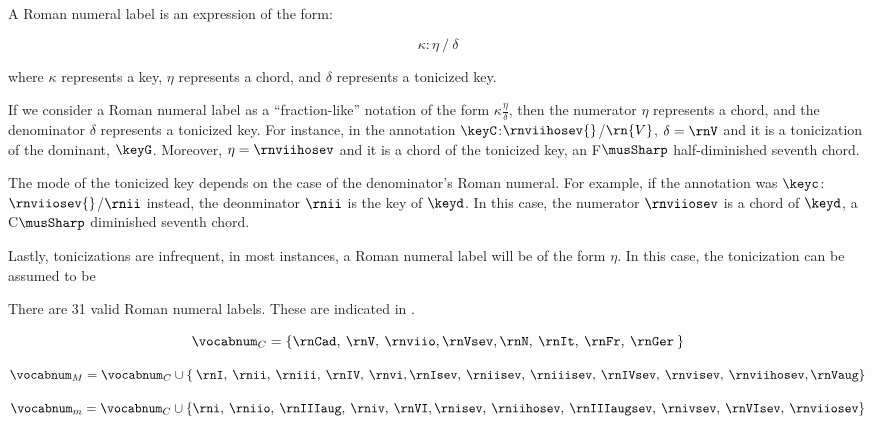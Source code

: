 
A Roman numeral label is an expression of the form:

\begin{equation}
    \kappa : \eta \: / \: \delta
\end{equation}

where $\kappa$ represents a key, $\eta$ represents a chord,
and $\delta$ represents a tonicized key.

If we consider a Roman numeral label as a ``fraction-like''
notation of the form $\kappa\frac{\eta}{\delta}$, then the
numerator $\eta$ represents a chord, and the denominator
$\delta$ represents a tonicized key. For instance, in the
annotation $\keyC$:$\rnviihosev{}$/$\rn{V}$, $\delta = \rnV$
and it is a tonicization of the dominant, $\keyG$. Moreover,
$\eta=\rnviihosev$ and it is a chord of the tonicized key,
an F$\musSharp$ half-diminished seventh chord.

The mode of the tonicized key depends on the case of the
denominator's Roman numeral. For example, if the annotation
was $\keyc$:$\rnviiosev{}$/$\rnii$ instead, the deonminator
$\rnii$ is the key of $\keyd$. In this case, the numerator
$\rnviiosev$ is a chord of $\keyd$, a C$\musSharp$
diminished seventh chord.

Lastly, tonicizations are infrequent, in most instances, a
Roman numeral label will be of the form $\eta$. In this
case, the tonicization can be assumed to be 

There are 31 valid Roman numeral labels. These are indicated
in .



\begin{equation}
    \vocabnum_{C} = \{ \rnCad, \: \rnV, \: \rnviio,
    \rnVsev, \rnN, \: \rnIt, \: \rnFr, \: \rnGer \: \}
\end{equation}

\begin{equation}
    \vocabnum_{M} = \vocabnum_{C} \cup \{ \: \rnI, \: \rnii, \: 
    \rniii, \: \rnIV, \: \rnvi, \rnIsev, \: \rniisev, \: 
    \rniiisev, \: \rnIVsev, \: \rnvisev, \: \rnviihosev, \rnVaug \}
\end{equation}

\begin{equation}
    \vocabnum_{m} = \vocabnum_{C} \cup  \{ \rni, \: \rniio, \: 
    \rnIIIaug, \: \rniv, \: \rnVI, \rnisev, \: \rniihosev, \: 
    \rnIIIaugsev, \: \rnivsev, \: \rnVIsev, \: \rnviiosev \}
\end{equation}

